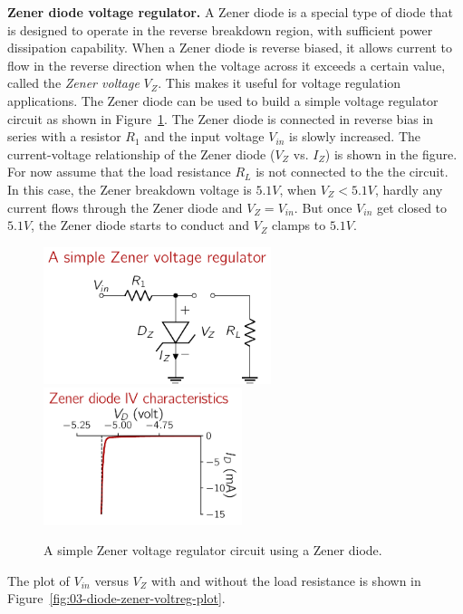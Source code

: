 \noindent\textbf{Zener diode voltage regulator.} A Zener diode is a special type of diode that is designed to operate in the reverse breakdown region, with sufficient power dissipation capability. When a Zener diode is reverse biased, it allows current to flow in the reverse direction when the voltage across it exceeds a certain value, called the \textit{Zener voltage} $V_Z$. This makes it useful for voltage regulation applications. The Zener diode can be used to build a simple voltage regulator circuit as shown in Figure~\ref{fig:03-diode-voltreg2}. The Zener diode is connected in reverse bias in series with a resistor $R_1$ and the input voltage $V_{in}$ is slowly increased.  The current-voltage relationship of the Zener diode ($V_Z$ vs. $I_Z$) is shown in the figure. For now assume that the load resistance $R_L$ is not connected to the the circuit. In this case, the Zener breakdown voltage is $5.1V$, when $V_Z < 5.1V$, hardly any current flows through the Zener diode and $V_Z = V_{in}$. But once $V_{in}$ get closed to $5.1V$, the Zener diode starts to conduct and $V_Z$ clamps to $5.1V$.

\begin{figure}[htbp]
    \centering
    \includegraphics[height=4.0cm]{figures/ch03/fig03-diode-zener.pdf}
    \hspace{1em} %
    \includegraphics[height=4.0cm]{figures/ch03/fig03-zener-iv-curve.pdf}
    \caption{A simple Zener voltage regulator circuit using a Zener diode.}
    \label{fig:03-diode-voltreg2}
\end{figure}

The plot of $V_{in}$ versus $V_Z$ with and without the load resistance is shown in Figure~\ref{fig:03-diode-zener-voltreg-plot}.

